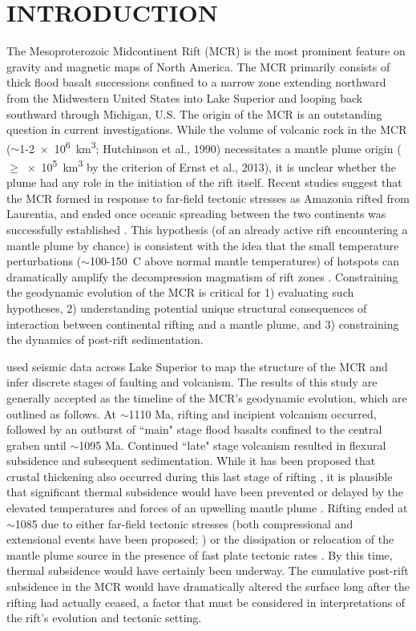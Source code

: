 \documentclass[12pt,letterpaper]{article}
\begin{document}
\section*{INTRODUCTION}
The Mesoproterozoic Midcontinent Rift (MCR) is the most prominent feature on gravity and magnetic maps of North America. The MCR primarily consists of thick flood basalt successions confined to a narrow zone extending northward from the Midwestern United States into Lake Superior and looping back southward through Michigan, U.S. The origin of the MCR is an outstanding question in current investigations. While the volume of volcanic rock in the MCR ($\sim$1-\SI{2e6}{km^3}; Hutchinson et al., 1990\nocite{Hutchinson1990a}) necessitates a mantle plume origin ($\geq$\SI{e5}{km^3} by the criterion of Ernst et al., 2013\nocite{Ernst2013b}), it is unclear whether the plume had any role in the initiation of the rift itself. Recent studies suggest that the MCR formed in response to far-field tectonic stresses as Amazonia rifted from Laurentia, and ended once oceanic spreading between the two continents was successfully established \citep{Stein2014a}. This hypothesis (of an already active rift encountering a mantle plume by chance) is consistent with the idea that the small temperature perturbations ($\sim$100-150\textdegree\ C above normal mantle temperatures) of hotspots can dramatically amplify the decompression magmatism of rift zones \citep{White1989a}. Constraining the geodynamic evolution of the MCR is critical for 1) evaluating such hypotheses, 2) understanding potential unique structural consequences of interaction between continental rifting and a mantle plume, and 3) constraining the dynamics of post-rift sedimentation.\par

\cite{Cannon1992a} used seismic data across Lake Superior to map the structure of the MCR and infer discrete stages of faulting and volcanism. The results of this study are generally accepted as the timeline of the MCR's geodynamic evolution, which are outlined as follows. At $\sim$1110 Ma, rifting and incipient volcanism occurred, followed by an outburst of ``main" stage flood basalts confined to the central graben until $\sim$1095 Ma. Continued ``late" stage volcanism resulted in flexural subsidence and subsequent sedimentation. While it has been proposed that crustal thickening also occurred during this last stage of rifting \citep{Stein2015a}, it is plausible that significant thermal subsidence would have been prevented or delayed by the elevated temperatures and forces of an upwelling mantle plume \citep{White1997a}. Rifting ended at $\sim$1085 due to either far-field tectonic stresses (both compressional and extensional events have been proposed; \cite{Stein2014a,Cannon1994a}) or the dissipation or relocation of the mantle plume source in the presence of fast plate tectonic rates \citep{Swanson-Hysell2014a}. By this time, thermal subsidence would have certainly been underway. The cumulative post-rift subsidence in the MCR would have dramatically altered the surface long after the rifting had actually ceased, a factor that must be considered in interpretations of the rift's evolution and tectonic setting.\par
\end{document}
